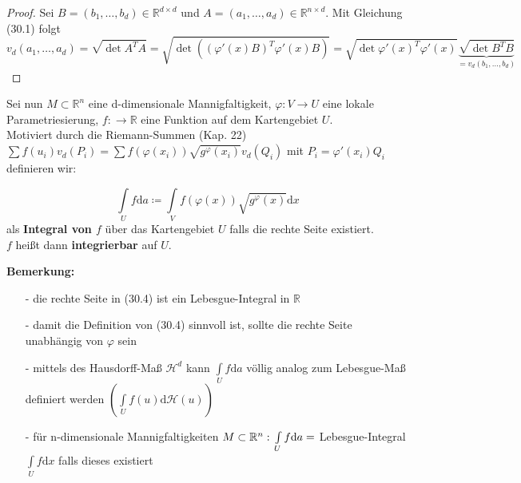 \begin{proof}
    Sei $B = (b_1, \ldots, b_d) \in \mathbb{R}^{d \times d}$ und 
    $A = (a_1, \ldots, a_d) \in \mathbb{R}^{n \times d}$. Mit Gleichung (30.1) folgt
	\begin{equation*}
		v_d(a_1, \ldots, a_d) 
    	= \sqrt{\det A^T A} = \sqrt{\det ((\varphi'(x) B)^T \varphi'(x) B)}
   		= \sqrt{\det \varphi'(x)^T \varphi'(x)} 
   		\underbrace{\sqrt{\det B^T B}}_{= v_d(b_1, \ldots, b_d)}
	\end{equation*}	    
\end{proof}

Sei nun $M \subset \mathbb{R}^n $ eine d-dimensionale Mannigfaltigkeit,
$\varphi: V \rightarrow U $ eine lokale Parametriesierung,
$f: \rightarrow \mathbb{R} $ eine Funktion auf dem Kartengebiet $U$.\\
Motiviert durch die Riemann-Summen (Kap. 22)\\
$\sum f(u_i) v_d(P_i) = \sum f(\varphi(x_i)) \sqrt{g^\varphi (x_i)} v_d(Q_i) $
mit $P_i = \varphi'(x_i) Q_i $
definieren wir:

\begin{definition}
    \begin{equation}
        \int\limits_U f \mathrm{d}a 
        \coloneqq \int\limits_V f(\varphi(x)) \sqrt{g^\varphi (x)} \mathrm{d}x
    \end{equation}
    als \textbf{Integral von $f$} über das Kartengebiet $U$ falls die rechte
    Seite existiert.\\
    $f$ heißt dann \textbf{integrierbar} auf $U$.
\end{definition}

\textbf{Bemerkung:}
\begin{enumerate}
    \item[-]
        die rechte Seite in (30.4) ist ein Lebesgue-Integral in $\mathbb{R}$
    \item[-]
        damit die Definition von (30.4) sinnvoll ist, sollte die rechte Seite
        unabhängig von $\varphi$ sein
    \item[-]
        mittels des Hausdorff-Maß $\mathcal{H}^d $ kann
        $\int\limits_U f \mathrm{d}a $
        völlig analog zum Lebesgue-Maß definiert werden
        $\left(\int\limits_U f(u) \mathrm{d} \mathcal{H} (u) \right) $
    \item[-]
        für n-dimensionale Mannigfaltigkeiten $M \subset \mathbb{R}^n: \\
        \int\limits_U f \mathrm{d}a = $ Lebesgue-Integral 
        $\int\limits_U f \mathrm{d}x $ falls dieses existiert
\end{enumerate}

